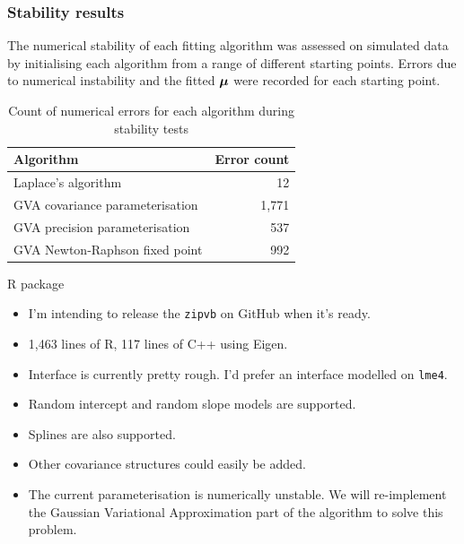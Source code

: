 \documentclass{beamer}
\begin{document}
	\begin{frame}
		\frametitle{Stability results}
		
		
		The numerical stability of each fitting algorithm was assessed on simulated data by initialising
		each algorithm from a range of different starting points. Errors due to numerical instability and the fitted
		${\boldsymbol \mu}$ were recorded for each starting point.
		
		\begin{table}
			\caption{Count of numerical errors for each algorithm during stability tests}
			\label{tab:stability_results}
			\begin{tabular}{|l|r|}
				\hline
				Algorithm           & Error count \\
				\hline
				Laplace's algorithm & 12          \\
				GVA covariance parameterisation                & 1,771       \\
				GVA precision parameterisation              & 537         \\
				GVA Newton-Raphson fixed point              & 992         \\
				\hline
			\end{tabular}
		\end{table}
	\end{frame}
	
	\begin{frame}{R package}
		\begin{itemize}
			\item I'm intending to release the \texttt{zipvb} on GitHub when it's ready.
			\item 1,463 lines of R, 117 lines of C++ using Eigen.
			\item Interface is currently pretty rough. I'd prefer an interface modelled on \texttt{lme4}.
			\item Random intercept and random slope models are supported.
			\item Splines are also supported.
			\item Other covariance structures could easily be added.
			\item The current parameterisation is numerically unstable. We will re-implement the Gaussian
						Variational Approximation part of the algorithm to solve this problem.
		\end{itemize}	
	\end{frame}
		
\end{document}
